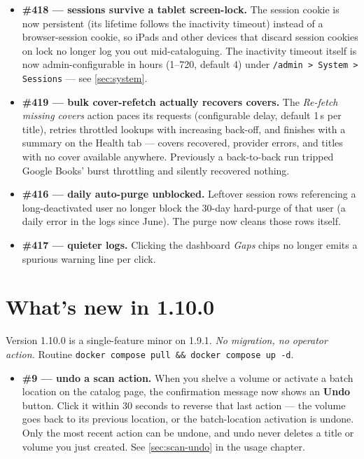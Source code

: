 \begin{itemize}
  \item \textbf{\#418 \string— sessions survive a tablet screen-lock.}
        The session cookie is now persistent (its lifetime follows the
        inactivity timeout) instead of a browser-session cookie, so
        iPads and other devices that discard session cookies on lock no
        longer log you out mid-cataloguing. The inactivity timeout
        itself is now admin-configurable in hours (1--720, default 4)
        under \texttt{/admin > System > Sessions} — see
        \autoref{sec:system}.
  \item \textbf{\#419 \string— bulk cover-refetch actually recovers
        covers.} The \emph{Re-fetch missing covers} action paces its
        requests (configurable delay, default 1\,s per title), retries
        throttled lookups with increasing back-off, and finishes with a
        summary on the Health tab — covers recovered, provider errors,
        and titles with no cover available anywhere. Previously a
        back-to-back run tripped Google Books' burst throttling and
        silently recovered nothing.
  \item \textbf{\#416 \string— daily auto-purge unblocked.} Leftover
        session rows referencing a long-deactivated user no longer
        block the 30-day hard-purge of that user (a daily error in the
        logs since June). The purge now cleans those rows itself.
  \item \textbf{\#417 \string— quieter logs.} Clicking the dashboard
        \emph{Gaps} chips no longer emits a spurious warning line per
        click.
\end{itemize}

\section{What's new in 1.10.0}\label{sec:whats-new-1.10.0}

Version 1.10.0 is a single-feature minor on 1.9.1. \emph{No
migration, no operator action.} Routine \texttt{docker compose pull
\&\& docker compose up -d}.

\begin{itemize}
  \item \textbf{\#9 \string— undo a scan action.} When you shelve a
        volume or activate a batch location on the catalog page, the
        confirmation message now shows an \textbf{Undo} button. Click
        it within 30 seconds to reverse that last action — the volume
        goes back to its previous location, or the batch-location
        activation is undone. Only the most recent action can be
        undone, and undo never deletes a title or volume you just
        created. See \autoref{sec:scan-undo} in the usage chapter.
\end{itemize}

